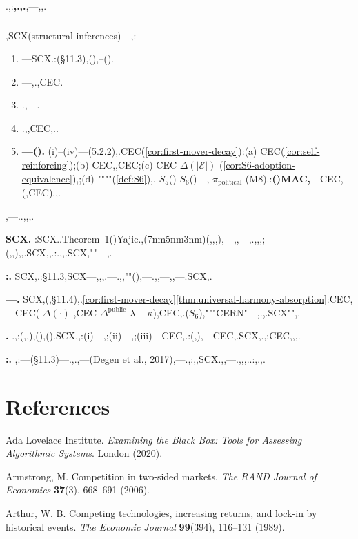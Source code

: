 \documentclass[12pt,a4paper]{article}
\theoremstyle{definition}
\theoremstyle{remark}
\begin{document}
.,:\textbf{,.,.},---,,.

\subsubsection*{}

,SCX(structural inferences)---,:

\begin{enumerate}[label=(\roman*)]
    \item ---SCX.:(§11.3),(),--().
    \item ---,.,CEC.
    \item .,---.
    \item .,,CEC,..
    \item \textbf{---().} (i)--(iv)---(5.2.2)\textit{},.CEC(\ref{cor:first-mover-decay}):(a) CEC(\ref{cor:self-reinforcing});(b) CEC,,CEC;(c) CEC $\Delta(|\mathcal{E}|)$ (\ref{cor:S6-adoption-equivalence}),;(d) """"(\ref{def:S6}),. $S_5$() $S_6$()---, $\pi_{\text{political}}$ (M8).:\textbf{()MAC,}---CEC,(,CEC).,.
\end{enumerate}

,---..,,,.

\textbf{SCX.} :SCX..Theorem~1()Yajie.,(7nm5nm3nm)(,,,),---,,---,.,,,;---(,,),,.SCX,,.:.,,.SCX,""---,.

\textbf{:.} SCX,.:§11.3,SCX---,,,.---.,,""(),---.,,---,,---.SCX,.

\textbf{---.} SCX,\textit{}(,§11.4),\textit{}.\ref{cor:first-mover-decay}\ref{thm:universal-harmony-absorption}:CEC,---CEC( $\Delta(\cdot)$ ,CEC $\Delta^{\text{public}}$  $\lambda - \kappa$),CEC,.($S_6$),"""CERN"---,.,.SCX"",.

\textbf{.} .,:(,,),(),().SCX,,:(i)---,;(ii)---,;(iii)---CEC,.:(,),---CEC,.SCX,.,:CEC,,,.

\textbf{:.} ,:---(§11.3)---.,.,---(Degen et al., 2017),---.,:,,SCX.,,---.,,,..:,.,.


\section*{References}

 Ada Lovelace Institute. \textit{Examining the Black Box: Tools for Assessing Algorithmic Systems}. London (2020).

 Armstrong, M. Competition in two-sided markets. \textit{The RAND Journal of Economics} \textbf{37}(3), 668--691 (2006).

 Arthur, W. B. Competing technologies, increasing returns, and lock-in by historical events. \textit{The Economic Journal} \textbf{99}(394), 116--131 (1989).
\end{document}
